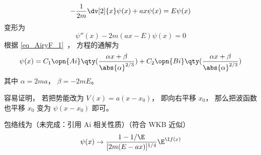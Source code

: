 
\begin{issues}
\issueDraft
\end{issues}


\begin{equation}
-\frac{1}{2m}\dv[2]{x}\psi(x) + ax \psi(x) = E\psi(x)
\end{equation}
变形为
\begin{equation}
\psi''(x) - 2m(ax - E)\psi(x) = 0
\end{equation}
根据 \autoref{eq_AiryF_1}~， 方程的通解为
\begin{equation}
\psi(x) = C_1\opn{Ai}\qty(\frac{\alpha x+\beta}{\abs{\alpha}^{2/3}}) + C_2 \opn{Bi}\qty(\frac{\alpha x+\beta}{\abs{\alpha}^{2/3}})
\end{equation}
其中 $\alpha = 2ma$， $\beta = -2mE$。

容易证明， 若把势能改为 $V(x) = a(x-x_0)$， 即向右平移 $x_0$， 那么把波函数也平移 $x_0$ 变为 $\psi(x-x_0)$ 即可。

包络线为（未完成：引用 Ai 相关性质）（符合 WKB 近似）
\begin{equation}
\psi(x) \to \frac{1-1/\E}{[2m(E-ax)]^{1/4}} \E^{\I f(x)}
\end{equation}
